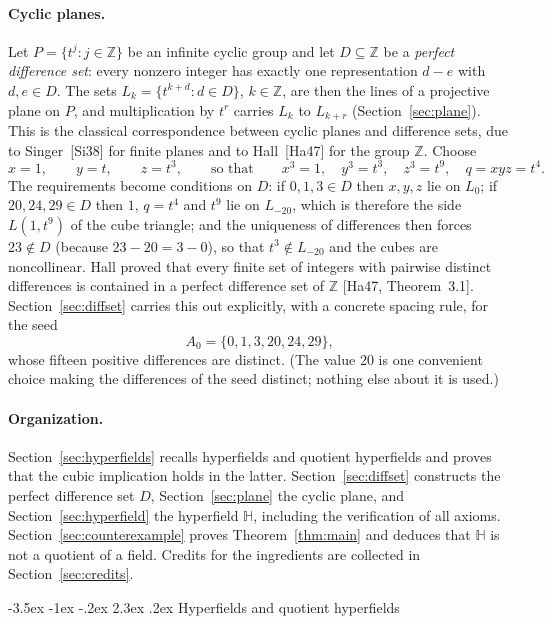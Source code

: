 \documentclass[11pt]{article}
\makeatletter
\renewcommand\section{\@startsection{section}{1}{\z@}
  {-3.5ex \@plus -1ex \@minus -.2ex}
  {2.3ex \@plus.2ex}
  {\normalfont\bfseries}}
\theoremstyle{plain}
\theoremstyle{definition}
\newcommand{\Z}{\mathbb{Z}}
\newcommand{\Hh}{\mathbb{H}}
\makeatother
\begin{document}
\paragraph{Cyclic planes.}
Let $P=\{t^j:j\in\Z\}$ be an infinite cyclic group and let
$D\subseteq\Z$ be a \emph{perfect difference set}: every nonzero
integer has exactly one representation $d-e$ with $d,e\in D$.  The sets
$L_k=\{t^{k+d}:d\in D\}$, $k\in\Z$, are then the lines of a projective
plane on $P$, and multiplication by $t^r$ carries $L_k$ to $L_{k+r}$
(Section~\ref{sec:plane}).  This is the classical correspondence between
cyclic planes and difference sets, due to Singer~[Si38] for finite
planes and to Hall~[Ha47] for the group $\Z$.  Choose
\[
 x=1,\qquad y=t,\qquad z=t^3,\qquad\text{so that}\qquad
 x^3=1,\quad y^3=t^3,\quad z^3=t^9,\quad q=xyz=t^4.
\]
The requirements become conditions on $D$: if $0,1,3\in D$ then $x,y,z$
lie on $L_0$; if $20,24,29\in D$ then $1$, $q=t^4$ and $t^9$ lie on
$L_{-20}$, which is therefore the side $L(1,t^9)$ of the cube triangle;
and the uniqueness of differences then forces $23\notin D$ (because
$23-20=3-0$), so that $t^3\notin L_{-20}$ and the cubes are
noncollinear.  Hall proved that every finite set of integers with
pairwise distinct differences is contained in a perfect difference set
of $\Z$ [Ha47, Theorem~3.1].  Section~\ref{sec:diffset} carries this
out explicitly, with a concrete spacing rule, for the seed
\[
 A_0=\{0,1,3,20,24,29\},
\]
whose fifteen positive differences are distinct.  (The value $20$ is one
convenient choice making the differences of the seed distinct; nothing
else about it is used.)

\paragraph{Organization.}
Section~\ref{sec:hyperfields} recalls hyperfields and quotient
hyperfields and proves that the cubic implication holds in the latter.
Section~\ref{sec:diffset} constructs the perfect difference set $D$,
Section~\ref{sec:plane} the cyclic plane, and
Section~\ref{sec:hyperfield} the hyperfield $\Hh$, including the
verification of all axioms.  Section~\ref{sec:counterexample} proves
Theorem~\ref{thm:main} and deduces that $\Hh$ is not a quotient of a
field.  Credits for the ingredients are collected in
Section~\ref{sec:credits}.

\section{Hyperfields and quotient hyperfields}\label{sec:hyperfields}
\end{document}
